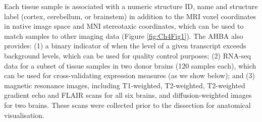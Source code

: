 Each tissue sample is associated with a numeric structure ID, name and structure label (cortex, cerebellum, or brainstem) in addition to the MRI voxel coordinates in native image space and MNI stereotaxic coordinates, which can be used to match samples to other imaging data (Figure \ref{fig:Ch4Fig1}). The AHBA also provides: (1) a binary indicator of when the level of a given transcript exceeds background levels, which can be used for quality control purposes; (2) RNA-seq data for a subset of tissue samples in two donor brains (120 samples each), which can be used for cross-validating expression measures (as we show below); and (3) magnetic resonance images, including T1-weighted, T2-weighted, T2-weighted gradient echo and FLAIR scans for all six brains, and diffusion-weighted images for two brains. These scans were collected prior to the dissection for anatomical visualisation.

